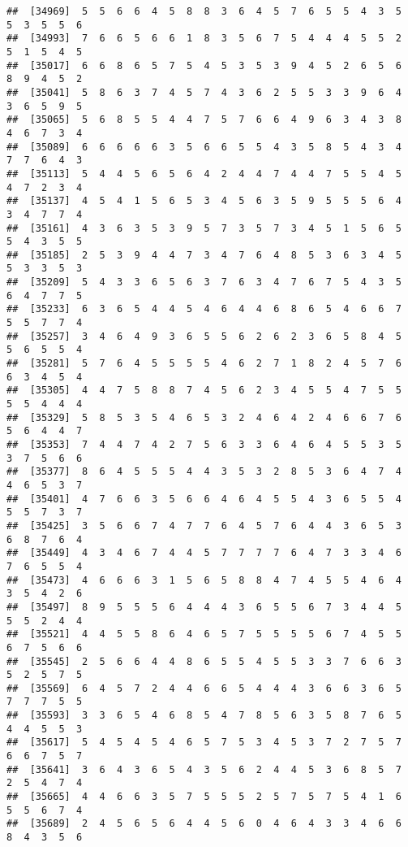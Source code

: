 \documentclass[
]{book}
\begin{document}
\begin{verbatim}
##  [34969]  5  5  6  6  4  5  8  8  3  6  4  5  7  6  5  5  4  3  5  5  3  5  5  6
##  [34993]  7  6  6  5  6  6  1  8  3  5  6  7  5  4  4  4  5  5  2  5  1  5  4  5
##  [35017]  6  6  8  6  5  7  5  4  5  3  5  3  9  4  5  2  6  5  6  8  9  4  5  2
##  [35041]  5  8  6  3  7  4  5  7  4  3  6  2  5  5  3  3  9  6  4  3  6  5  9  5
##  [35065]  5  6  8  5  5  4  4  7  5  7  6  6  4  9  6  3  4  3  8  4  6  7  3  4
##  [35089]  6  6  6  6  6  3  5  6  6  5  5  4  3  5  8  5  4  3  4  7  7  6  4  3
##  [35113]  5  4  4  5  6  5  6  4  2  4  4  7  4  4  7  5  5  4  5  4  7  2  3  4
##  [35137]  4  5  4  1  5  6  5  3  4  5  6  3  5  9  5  5  5  6  4  3  4  7  7  4
##  [35161]  4  3  6  3  5  3  9  5  7  3  5  7  3  4  5  1  5  6  5  5  4  3  5  5
##  [35185]  2  5  3  9  4  4  7  3  4  7  6  4  8  5  3  6  3  4  5  5  3  3  5  3
##  [35209]  5  4  3  3  6  5  6  3  7  6  3  4  7  6  7  5  4  3  5  6  4  7  7  5
##  [35233]  6  3  6  5  4  4  5  4  6  4  4  6  8  6  5  4  6  6  7  5  5  7  7  4
##  [35257]  3  4  6  4  9  3  6  5  5  6  2  6  2  3  6  5  8  4  5  5  6  5  5  4
##  [35281]  5  7  6  4  5  5  5  5  4  6  2  7  1  8  2  4  5  7  6  6  3  4  5  4
##  [35305]  4  4  7  5  8  8  7  4  5  6  2  3  4  5  5  4  7  5  5  5  5  4  4  4
##  [35329]  5  8  5  3  5  4  6  5  3  2  4  6  4  2  4  6  6  7  6  5  6  4  4  7
##  [35353]  7  4  4  7  4  2  7  5  6  3  3  6  4  6  4  5  5  3  5  3  7  5  6  6
##  [35377]  8  6  4  5  5  5  4  4  3  5  3  2  8  5  3  6  4  7  4  4  6  5  3  7
##  [35401]  4  7  6  6  3  5  6  6  4  6  4  5  5  4  3  6  5  5  4  5  5  7  3  7
##  [35425]  3  5  6  6  7  4  7  7  6  4  5  7  6  4  4  3  6  5  3  6  8  7  6  4
##  [35449]  4  3  4  6  7  4  4  5  7  7  7  7  6  4  7  3  3  4  6  7  6  5  5  4
##  [35473]  4  6  6  6  3  1  5  6  5  8  8  4  7  4  5  5  4  6  4  3  5  4  2  6
##  [35497]  8  9  5  5  5  6  4  4  4  3  6  5  5  6  7  3  4  4  5  5  5  2  4  4
##  [35521]  4  4  5  5  8  6  4  6  5  7  5  5  5  5  6  7  4  5  5  6  7  5  6  6
##  [35545]  2  5  6  6  4  4  8  6  5  5  4  5  5  3  3  7  6  6  3  5  2  5  7  5
##  [35569]  6  4  5  7  2  4  4  6  6  5  4  4  4  3  6  6  3  6  5  7  7  7  5  5
##  [35593]  3  3  6  5  4  6  8  5  4  7  8  5  6  3  5  8  7  6  5  4  4  5  5  3
##  [35617]  5  4  5  4  5  4  6  5  7  5  3  4  5  3  7  2  7  5  7  6  6  7  5  7
##  [35641]  3  6  4  3  6  5  4  3  5  6  2  4  4  5  3  6  8  5  7  2  5  4  7  4
##  [35665]  4  4  6  6  3  5  7  5  5  5  2  5  7  5  7  5  4  1  6  5  5  6  7  4
##  [35689]  2  4  5  6  5  6  4  4  5  6  0  4  6  4  3  3  4  6  6  8  4  3  5  6

\end{verbatim}
\end{document}
